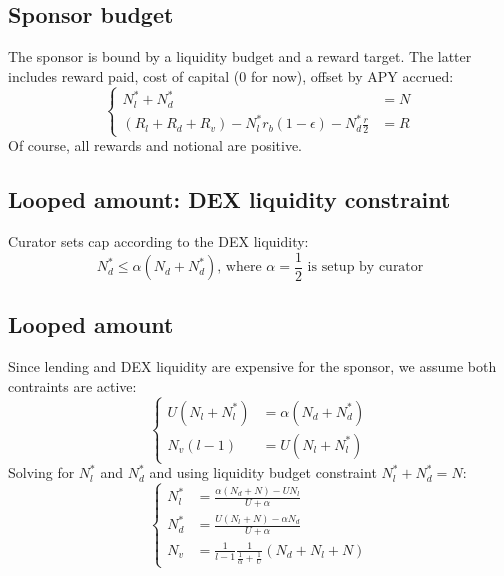 \documentclass{article}
\begin{document}
    \subsection{Sponsor budget}

    The sponsor is bound by a liquidity budget and a reward target.
    The latter includes reward paid, cost of capital (0 for now), offset by APY accrued:
    \begin{equation*}
        \left\{
        \begin{aligned}
        N_l^* + N_d^* &= N\\
        (R_l+R_d+R_v) - N_l^* r_b(1-\epsilon) - N_d^* \frac{r}{2} &= R
        \end{aligned}
        \right.
    \end{equation*}
    Of course, all rewards and notional are positive.

    \subsection{Looped amount: DEX liquidity constraint}
    Curator sets cap according to the DEX liquidity:
    \begin{equation}
        N_d^* \leq \alpha (N_d+N_d^*)        \text{, where } \alpha=\frac{1}{2} \text{ is setup by curator}
    \end{equation}
    
\subsection{Looped amount}

    Since lending and DEX liquidity are expensive for the sponsor, we assume both contraints are active:
    \begin{equation}
        \left\{
        \begin{aligned}
            U(N_l+N_l^*) &= \alpha (N_d+N_d^*)\\
            N_v(l-1)&= U(N_l+N_l^*)
        \end{aligned}
        \right.
    \end{equation}
    Solving for $N_l^*$ and $N_d^*$ and using liquidity budget constraint $N_l^* + N_d^* = N$:
    \begin{equation}
        \left\{
        \begin{aligned}
            N_l^* &= \frac{\alpha (N_d+N) - U N_l}{U + \alpha} \\
            N_d^* &= \frac{U(N_l+N)-\alpha N_d}{U + \alpha}\\
            N_v&= \frac{1}{l-1}\frac{1}{\frac{1}{\alpha}  + \frac{1}{U}}(N_d+N_l+N)
        \end{aligned}
        \right.
    \end{equation}
    
\end{document}
